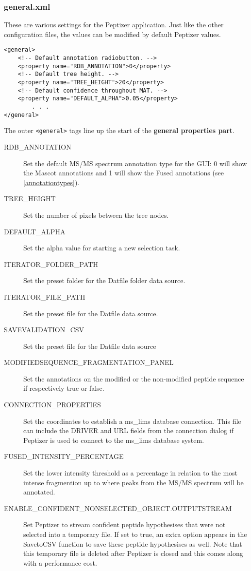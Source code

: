 \subsubsection{general.xml}
\npar These are various settings for the Peptizer application. Just like the other configuration files, the values can be modified by default Peptizer values.
%
\begin{verbatim}
<general>
	<!-- Default annotation radiobutton. -->
	<property name="RDB_ANNOTATION">0</property>
	<!-- Default tree height. -->
	<property name="TREE_HEIGHT">20</property>
	<!-- Default confidence throughout MAT. -->
	<property name="DEFAULT_ALPHA">0.05</property>
		. . . 
</general>
\end{verbatim}
%
\npar The outer \verb!<general>! tags line up the start of the \textbf{general properties part}.
\begin{description}
\item[RDB\_ANNOTATION] Set the default MS/MS spectrum annotation type for the GUI: 0 will show the Mascot annotations and 1 will show the Fused annotations (see \ref{annotationtypes}).
\item[TREE\_HEIGHT] Set the number of pixels between the tree nodes.
\item[DEFAULT\_ALPHA] Set the alpha value for starting a new selection task.
\item[ITERATOR\_FOLDER\_PATH] Set the preset folder for the Datfile folder data source. 
\item[ITERATOR\_FILE\_PATH] Set the preset file for the Datfile data source.
\item[SAVEVALIDATION\_CSV] Set the preset file for the Datfile data source
\item[MODIFIEDSEQUENCE\_FRAGMENTATION\_PANEL] Set the annotations on the modified or the non-modified peptide sequence if respectively true or false.
\item[CONNECTION\_PROPERTIES] Set the coordinates to establish a ms\_lims database connection. This file can include the DRIVER and URL fields from the connection dialog
		if Peptizer is used to connect to the ms\_lims database system.
\item[FUSED\_INTENSITY\_PERCENTAGE] Set the lower intensity threshold as a percentage in relation to the most intense fragmention up to where peaks from the MS/MS spectrum will be annotated.
\item[ENABLE\_CONFIDENT\_NONSELECTED\_OBJECT.OUTPUTSTREAM] Set Peptizer to stream confident peptide hypothesises that were not selected into a temporary file. If set to true, an extra option appears in the SavetoCSV function to save these peptide hypothesises as well. Note that this temporary file is deleted after Peptizer is closed and this comes along with a performance cost.

\end{description}
